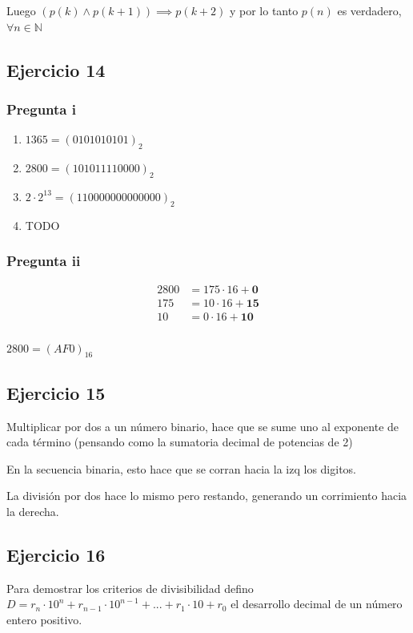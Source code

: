 Luego $ (p(k) \wedge p(k+1)) \implies p(k+2) $ y por lo tanto $ p(n) $ es verdadero, $ \forall n \in \mathbb{N} $

\subsection{Ejercicio 14}
\subsubsection{Pregunta i}
\begin{enumerate}
    \item $ 1365 = (0101010101)_2$
    \item $ 2800 = (101011110000)_2$
    \item $ 2\cdot 2^{13} = (110000000000000)_2$
    \item TODO
\end{enumerate}

\subsubsection{Pregunta ii}
\begin{align*}
    2800 &= 175 \cdot 16 + \textbf{0} \\
    175 &= 10 \cdot 16 + \textbf{15} \\
    10 &= 0 \cdot 16 + \textbf{10} \\
\end{align*}

$ 2800 = (AF0)_{16}$

\subsection{Ejercicio 15}
Multiplicar por dos a un número binario, hace que se sume uno al exponente de cada término (pensando como la sumatoria decimal de potencias de 2)

En la secuencia binaria, esto hace que se corran hacia la izq los digitos.

La división por dos hace lo mismo pero restando, generando un corrimiento hacia la derecha.

\subsection{Ejercicio 16}
Para demostrar los criterios de divisibilidad defino $ D = r_n \cdot 10^n + r_{n-1}\cdot 10^{n-1}+...+r_1 \cdot 10 + r_0 $ el desarrollo decimal de un número entero positivo.

